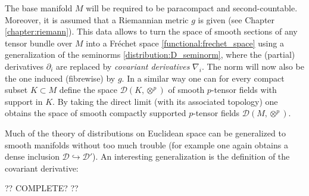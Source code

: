     The base manifold $M$ will be required to be paracompact and second-countable. Moreover, it is assumed that a Riemannian metric $g$ is given (see Chapter \ref{chapter:riemann}). This data allows to turn the space of smooth sections of any tensor bundle over $M$ into a Fr\'echet space \ref{functional:frechet_space} using a generalization of the seminorms \ref{distribution:D_seminorm}, where the (partial) derivatives $\partial_i$ are replaced by \textit{covariant derivatives} $\nabla_i$. The norm will now also be the one induced (fibrewise) by $g$. In a similar way one can for every compact subset $K\subset M$ define the space $\mathcal{D}(K,\otimes^p)$ of smooth $p$-tensor fields with support in $K$. By taking the direct limit (with its associated topology) one obtains the space of smooth compactly supported $p$-tensor fields $\mathcal{D}(M,\otimes^p)$.


    Much of the theory of distributions on Euclidean space can be generalized to smooth manifolds without too much trouble (for example one again obtains a dense inclusion $\mathcal{D}\hookrightarrow\mathcal{D}'$). An interesting generalization is the definition of the covariant derivative:

    ?? COMPLETE? ??